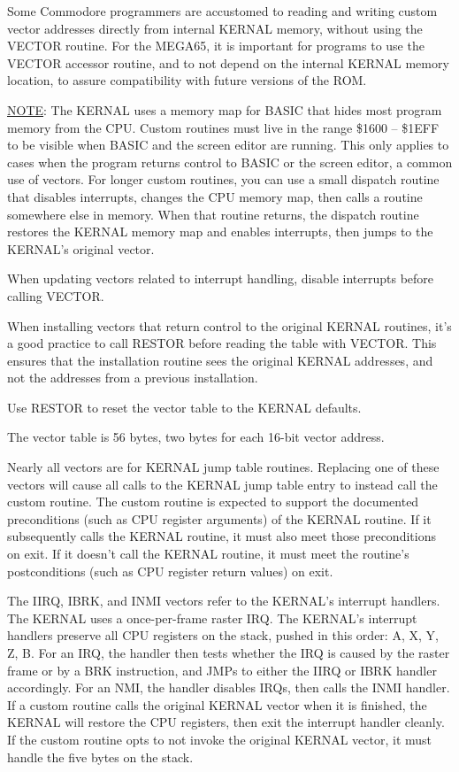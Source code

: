 \begin{description}[leftmargin=2cm,style=nextline]
        Some Commodore programmers are accustomed to reading and writing custom vector addresses directly from internal KERNAL memory, without using the VECTOR routine. For the MEGA65, it is important for programs to use the VECTOR accessor routine, and to not depend on the internal KERNAL memory location, to assure compatibility with future versions of the ROM.

        \underline{NOTE}: The KERNAL uses a memory map for BASIC that hides most program memory from the CPU. Custom routines must live in the range \$1600 -- \$1EFF to be visible when BASIC and the screen editor are running. This only applies to cases when the program returns control to BASIC or the screen editor, a common use of vectors. For longer custom routines, you can use a small dispatch routine that disables interrupts, changes the CPU memory map, then calls a routine somewhere else in memory. When that routine returns, the dispatch routine restores the KERNAL memory map and enables interrupts, then jumps to the KERNAL's original vector.

        When updating vectors related to interrupt handling, disable interrupts before calling VECTOR.

        When installing vectors that return control to the original KERNAL routines, it's a good practice to call RESTOR before reading the table with VECTOR. This ensures that the installation routine sees the original KERNAL addresses, and not the addresses from a previous installation.

        Use RESTOR to reset the vector table to the KERNAL defaults.

    \item [Vector table:]
        The vector table is 56 bytes, two bytes for each 16-bit vector address.

        Nearly all vectors are for KERNAL jump table routines. Replacing one of these vectors will cause all calls to the KERNAL jump table entry to instead call the custom routine. The custom routine is expected to support the documented preconditions (such as CPU register arguments) of the KERNAL routine. If it subsequently calls the KERNAL routine, it must also meet those preconditions on exit. If it doesn't call the KERNAL routine, it must meet the routine's postconditions (such as CPU register return values) on exit.

        The IIRQ, IBRK, and INMI vectors refer to the KERNAL's interrupt handlers. The KERNAL uses a once-per-frame raster IRQ. The KERNAL's interrupt handlers preserve all CPU registers on the stack, pushed in this order: A, X, Y, Z, B. For an IRQ, the handler then tests whether the IRQ is caused by the raster frame or by a BRK instruction, and JMPs to either the IIRQ or IBRK handler accordingly. For an NMI, the handler disables IRQs, then calls the INMI handler. If a custom routine calls the original KERNAL vector when it is finished, the KERNAL will restore the CPU registers, then exit the interrupt handler cleanly. If the custom routine opts to not invoke the original KERNAL vector, it must handle the five bytes on the stack.


\end{description}

